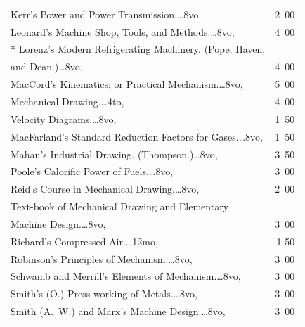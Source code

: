 \documentclass[a4paper,12pt]{book}[2004/02/16]
\theoremstyle{ilemma}
\theoremstyle{itheorem}
\theoremstyle{iother}
\theoremstyle{icorollary}
\theoremstyle{numcorollary}
\theoremstyle{idefinition}
\begin{document}
\begin{longtable}{@{}l@{ }r@{}}
Kerr's Power and Power Transmission.\dotfill\ldots 8vo, &2\ 00\\

Leonard's Machine Shop, Tools, and Methods.\dotfill\ldots 8vo, &4\ 00\\

* Lorenz's Modern Refrigerating Machinery. (Pope, Haven,\\

\indent\indent and Dean.)\dotfill\ldots 8vo, &4\ 00\\

MacCord's Kinematics; or Practical Mechanism.\dotfill\ldots 8vo, &5\ 00\\

\indent Mechanical Drawing.\dotfill\ldots 4to, &4\ 00\\

\indent Velocity Diagrams.\dotfill\ldots 8vo, &1\ 50\\



MacFarland's Standard Reduction Factors for Gases.\dotfill\ldots 8vo,
&1\ 50\\

Mahan's Industrial Drawing. (Thompson.)\dotfill\ldots 8vo, &3\ 50\\

Poole's Calorific Power of Fuels.\dotfill\ldots 8vo, &3\ 00\\

Reid's Course in Mechanical Drawing.\dotfill\ldots 8vo, &2\ 00\\

\indent Text-book of Mechanical Drawing and Elementary\\

\nopagebreak

\indent\indent Machine Design.\dotfill\ldots 8vo, &3\ 00\\

Richard's Compressed Air.\dotfill\ldots 12mo, &1 50\\

Robinson's Principles of Mechanism.\dotfill\ldots 8vo, &3\ 00\\

Schwamb and Merrill's Elements of Mechanism.\dotfill\ldots 8vo, &3\ 00\\

Smith's (O.) Press-working of Metals.\dotfill\ldots 8vo, &3\ 00\\

Smith (A.~W.) and Marx's Machine Design.\dotfill\ldots 8vo, &3\ 00\\


\end{longtable}
\end{document}
